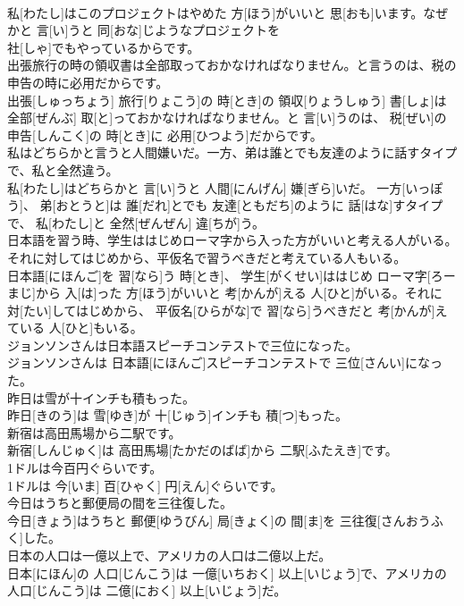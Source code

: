 \documentclass[8pt]{extreport}
\begin{document}
\begin{CJK}{UTF8}{min}
\\	私[わたし]はこのプロジェクトはやめた 方[ほう]がいいと 思[おも]います。なぜかと 言[い]うと 同[おな]じようなプロジェクトを 
\\	社[しゃ]でもやっているからです。
\\	出張旅行の時の領収書は全部取っておかなければなりません。と言うのは、税の申告の時に必用だからです。	
\\	出張[しゅっちょう] 旅行[りょこう]の 時[とき]の 領収[りょうしゅう] 書[しょ]は 全部[ぜんぶ] 取[と]っておかなければなりません。と 言[い]うのは、 税[ぜい]の 申告[しんこく]の 時[とき]に 必用[ひつよう]だからです。
\\	私はどちらかと言うと人間嫌いだ。一方、弟は誰とでも友達のように話すタイプで、私と全然違う。	
\\	私[わたし]はどちらかと 言[い]うと 人間[にんげん] 嫌[ぎら]いだ。 一方[いっぽう]、 弟[おとうと]は 誰[だれ]とでも 友達[ともだち]のように 話[はな]すタイプで、 私[わたし]と 全然[ぜんぜん] 違[ちが]う。
\\	日本語を習う時、学生ははじめローマ字から入った方がいいと考える人がいる。それに対してはじめから、平仮名で習うべきだと考えている人もいる。	
\\	日本語[にほんご]を 習[なら]う 時[とき]、 学生[がくせい]ははじめ ローマ字[ろーまじ]から 入[は]った 方[ほう]がいいと 考[かんが]える 人[ひと]がいる。それに 対[たい]してはじめから、 平仮名[ひらがな]で 習[なら]うべきだと 考[かんが]えている 人[ひと]もいる。
\\	ジョンソンさんは日本語スピーチコンテストで三位になった。	
\\	ジョンソンさんは 日本語[にほんご]スピーチコンテストで 三位[さんい]になった。
\\	昨日は雪が十インチも積もった。	
\\	昨日[きのう]は 雪[ゆき]が 十[じゅう]インチも 積[つ]もった。
\\	新宿は高田馬場から二駅です。	
\\	新宿[しんじゅく]は 高田馬場[たかだのばば]から 二駅[ふたえき]です。
\\	1ドルは今百円ぐらいです。	
\\	1ドルは 今[いま] 百[ひゃく] 円[えん]ぐらいです。
\\	今日はうちと郵便局の間を三往復した。	
\\	今日[きょう]はうちと 郵便[ゆうびん] 局[きょく]の 間[ま]を 三往復[さんおうふく]した。
\\	日本の人口は一億以上で、アメリカの人口は二億以上だ。	
\\	日本[にほん]の 人口[じんこう]は 一億[いちおく] 以上[いじょう]で、アメリカの 人口[じんこう]は 二億[におく] 以上[いじょう]だ。

\end{CJK}
\end{document}
